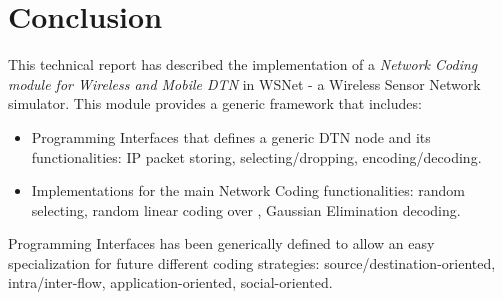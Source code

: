\documentclass[a4paper,twoside]{article}
\begin{document}
\newpage

\section{Conclusion}

This technical report has described the implementation of a \emph{Network Coding module for Wireless and Mobile DTN} in WSNet - a Wireless Sensor Network simulator. This module provides a generic framework that includes: 
\begin{itemize}
\item Programming Interfaces that defines a generic DTN node and its functionalities: IP packet storing, selecting/dropping, encoding/decoding.
\item Implementations for the main Network Coding functionalities: random selecting, random linear coding over , Gaussian Elimination decoding.
\end{itemize}
Programming Interfaces has been generically defined to allow an easy specialization for future different coding strategies: source/destination-oriented, intra/inter-flow, application-oriented, social-oriented.

\newpage



\end{document}
